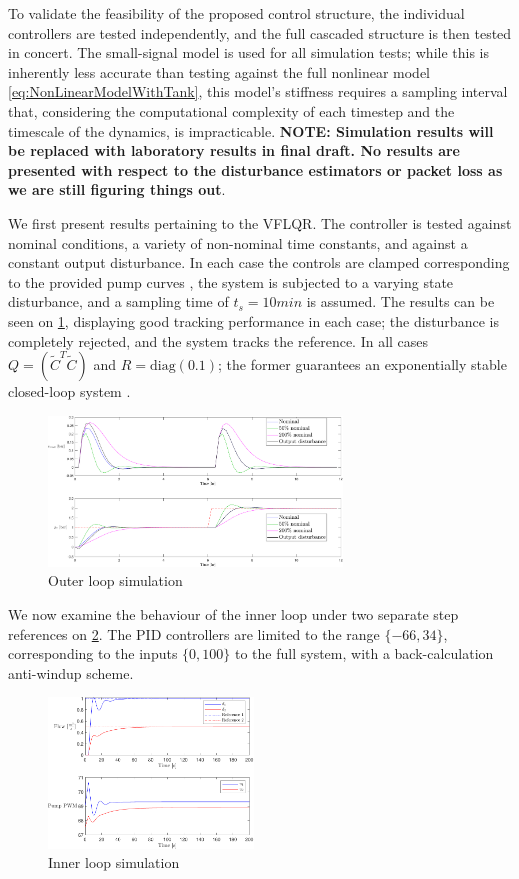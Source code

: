 To validate the feasibility of the proposed control structure, the individual controllers are tested independently, and the full cascaded structure is then tested in concert. The small-signal model is used for all simulation tests; while this is inherently less accurate than testing against the full nonlinear model \cref{eq:NonLinearModelWithTank}, this model's stiffness requires a sampling interval that, considering the computational complexity of each timestep and the timescale of the dynamics, is impracticable. \textbf{NOTE: Simulation results will be replaced with laboratory results in final draft. No results are presented with respect to the disturbance estimators or packet loss as we are still figuring things out}.

We first present results pertaining to the VFLQR. The controller is tested against nominal conditions, a variety of non-nominal time constants, and against a constant output disturbance. In each case the controls are clamped corresponding to the provided pump curves \cite{GrundfosDatablad}, the system is subjected to a varying state disturbance, and a sampling time of $t_s = 10\si{min}$ is assumed. The results can be seen on \cref{fig:LQRTracking}, displaying good tracking performance in each case; the disturbance is completely rejected, and the system tracks the reference. In all cases $Q = \left(\tilde{C}^T\tilde{C}\right)$ and $R = \text{diag}(0.1)$; the former guarantees an exponentially stable closed-loop system \cite{Liberzon2012}.


\begin{figure}[h!]
	\includegraphics[height=4cm, width=\linewidth]{Graphics/LQRTracking.pdf}
	\caption{Outer loop simulation}
	\label{fig:LQRTracking}
\end{figure}

 We now examine the behaviour of the inner loop under two separate step references on \cref{fig:PumpSimulation}. The PID controllers are limited to the range $\{-66,34\}$, corresponding to the inputs $\{0,100\}$ to the full system, with a back-calculation anti-windup scheme.

\begin{figure}[h!]
	\includegraphics[width=\linewidth,height=4cm]{Graphics/PumpSimulation.pdf}
	\caption{Inner loop simulation}
	\label{fig:PumpSimulation}
\end{figure}

